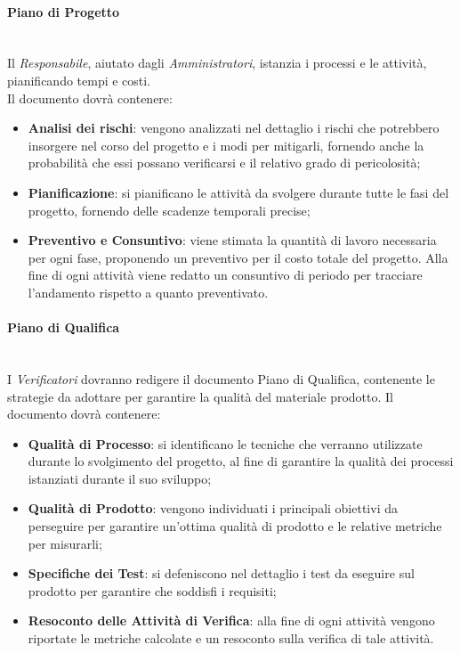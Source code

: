 \paragraph{Piano di Progetto} \label{ProcessiPrimari_PianoProgetto} \-\\
Il \textit{Responsabile}, aiutato dagli \textit{Amministratori}, istanzia i processi e le attività, pianificando tempi e costi. \\
Il documento dovrà contenere:
\begin{itemize}
	\item \textbf{Analisi dei rischi}: vengono analizzati nel dettaglio i rischi che potrebbero insorgere nel corso del progetto e i modi per mitigarli, fornendo anche la probabilità che essi possano verificarsi e il relativo grado di pericolosità; 
	\item \textbf{Pianificazione}: si pianificano le attività da svolgere durante tutte le fasi del progetto, fornendo delle scadenze temporali precise;
	\item \textbf{Preventivo e Consuntivo}:  viene stimata la quantità
	di lavoro necessaria per ogni fase, proponendo un preventivo per il costo totale
	del progetto. Alla fine di ogni attività viene redatto un consuntivo di periodo
	per tracciare l’andamento rispetto a quanto preventivato.

\end{itemize}

\paragraph{Piano di Qualifica} \label{ProcessiPrimari_PianoQualifica} \-\\
I \textit{Verificatori} dovranno redigere il documento Piano di Qualifica, contenente le strategie da adottare per garantire la qualità del materiale prodotto.
Il documento dovrà contenere:
\begin{itemize}
	\item \textbf{Qualità di Processo}: si identificano le tecniche che verranno utilizzate
	durante lo svolgimento del progetto, al fine di garantire la qualità dei processi istanziati durante il suo sviluppo;
	\item \textbf{Qualità di Prodotto}: vengono individuati i principali obiettivi da perseguire per garantire un'ottima qualità di prodotto e le relative metriche per misurarli;
	\item \textbf{Specifiche dei Test}: si defeniscono nel dettaglio i test da eseguire sul prodotto per garantire che soddisfi i requisiti;
	\item \textbf{Resoconto delle Attività di Verifica}: alla fine di ogni attività vengono riportate le metriche calcolate e un resoconto sulla verifica di tale attività.
\end{itemize}

